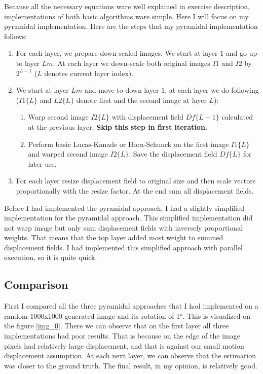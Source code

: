 \documentclass[runningheads]{llncs}
\begin{document}
Because all the necessary equations ware well explained in exercise description, implementations of both basic algorithms ware simple. Here I will focus on my pyramidal implementation. \newpage Here are the steps that my pyramidal implementation follows:

\begin{enumerate}
    \item For each layer, we prepare down-scaled images. We start at layer $1$ and go up to layer $Lm$. At each layer we down-scale both original images $I1$ and $I2$ by $2^{L-1}$ ($L$ denotes current layer index).
    \item We start at layer $Lm$ and move to down layer $1$, at each layer we do following ($I1\{L\}$ and $L2\{L\}$ denote first and the second image at layer $L$):
    \begin{enumerate}
        \item Warp second image $I2\{L\}$ with displacement field $Df\{L-1\}$ calculated at the previous layer. \textbf{Skip this step in first iteration.}
        \item Perform basic Lucas-Kanade or Horn-Schunck on the first image $I1\{L\}$ and warped second image $I2\{L\}$. Save the displacement field $Df\{L\}$ for later use.
    \end{enumerate}
    \item For each layer resize displacement field to original size and then scale vectors proportionally with the resize factor. At the end sum all displacement fields.
\end{enumerate}

Before I had implemented the pyramidal approach, I had a slightly simplified implementation for the pyramidal approach. This simplified implementation did not warp image but only sum displacement fields with inversely proportional weights. That means that the top layer added most weight to summed displacement fields. I had implemented this simplified approach with parallel execution, so it is quite quick.

\subsection{Comparison}

First I compared all the three pyramidal approaches that I had implemented on a random 1000x1000 generated image and its rotation of \ang{1}. This is visualized on the figure \ref{img_0}. There we can observe that on the first layer all three implementations had poor results. That is because on the edge of the image pixels had relatively large displacement, and that is against our small motion displacement assumption. At each next layer, we can observe that the estimation was closer to the ground truth. The final result, in my opinion, is relatively good.
\end{document}
